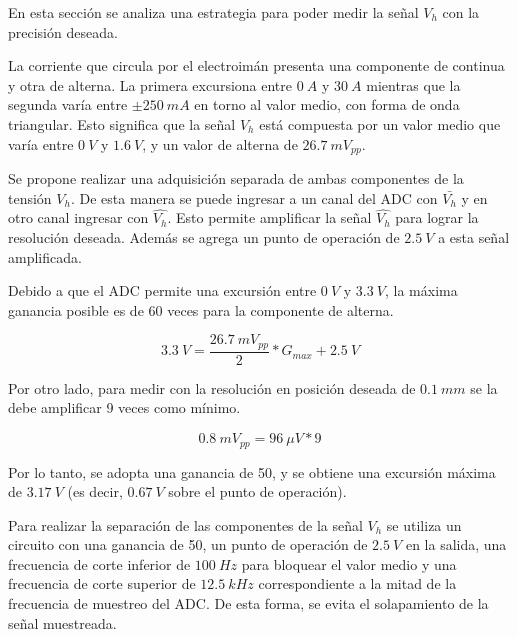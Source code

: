 En esta sección se analiza una estrategia para poder medir la señal $V_h$ con la precisión deseada.

La corriente que circula por el electroimán presenta una componente de continua y otra de alterna. La primera excursiona entre $0\:A$ y $30\:A$ mientras que la segunda varía entre $\pm 250\:mA$ en torno al valor medio, con forma de onda triangular. Esto significa que la señal $V_h$ está compuesta por un valor medio que varía entre $0\:V$ y $1.6\:V$, y un valor de alterna de $26.7\:mV_{pp}$.

Se propone realizar una adquisición separada de ambas componentes de la tensión $V_h$. De esta manera se puede ingresar a un canal del ADC con $\bar{V_h}$ y en otro canal ingresar con $\hat{V_h}$. Esto permite amplificar la señal $\hat{V_h}$ para lograr la resolución deseada. Además se agrega un punto de operación de $2.5\:V$ a esta señal amplificada.

Debido a que el ADC permite una excursión entre $0\:V$ y $3.3\:V$, la máxima ganancia posible es de 60 veces para la componente de alterna.

\begin{equation*}
	3.3 \:V = \frac{26.7\:mV_{pp}}{2}*G_{max}+2.5\:V
\end{equation*}


Por otro lado, para medir con la resolución en posición deseada de $0.1\:mm$ se la debe amplificar 9 veces como mínimo.

\begin{equation*}
	0.8\:mV_{pp} = 96\:\mu V * 9
\end{equation*}

Por lo tanto, se adopta una ganancia de 50, y se obtiene una excursión máxima de $3.17\:V$ (es decir, $0.67\:V$ sobre el punto de operación).

Para realizar la separación de las componentes de la señal $V_h$ se utiliza un circuito con una ganancia de 50, un punto de operación de $2.5\:V$ en la salida, una frecuencia de corte inferior de $100\:Hz$ para bloquear el valor medio y una frecuencia de corte superior de $12.5\:kHz$ correspondiente a la mitad de la frecuencia de muestreo del ADC. De esta forma, se evita el solapamiento de la señal muestreada.




